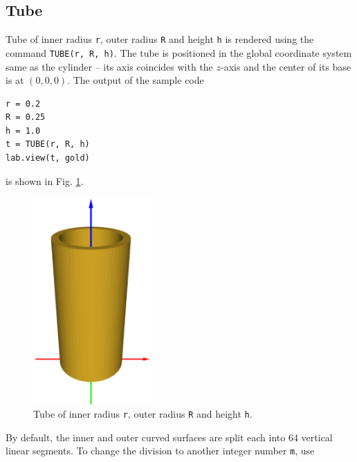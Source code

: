 \noindent

\subsection{Tube}

Tube of inner radius {\tt r}, outer radius {\tt R} and height
{\tt h} is rendered using the command {\tt TUBE(r, R, h)}. 
The tube is positioned in the global coordinate system 
same as the cylinder -- its axis coincides with the $z$-axis and 
the center of its base is at $(0, 0, 0)$. The output of the sample code\\

\begin{bbox}
\begin{verbatim}
r = 0.2
R = 0.25
h = 1.0
t = TUBE(r, R, h)
lab.view(t, gold)
\end{verbatim}
\end{bbox}
\vspace{6mm}

\noindent
is shown in Fig. \ref{fig:tube-1}.

\begin{figure}[!ht]
\begin{center}
\includegraphics[width=0.4\textwidth]{img/tube-1.png}
\end{center}
\vspace{-4mm}
\caption{Tube of inner radius {\tt r}, outer radius {\tt R} and height {\tt h}.}
\label{fig:tube-1}
\end{figure}
\noindent
By default, the inner and outer curved surfaces are split each into 64 vertical 
linear segments. To change the division to another integer number {\tt m}, use\\

